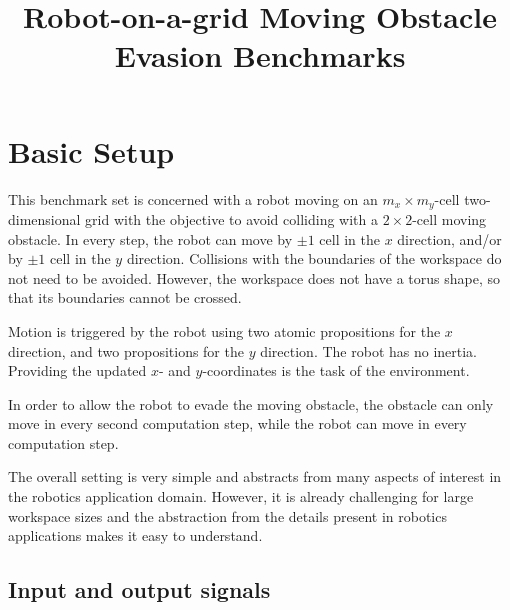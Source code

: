 \documentclass[a4paper,conference,10pt]{IEEEtran}
\author{\IEEEauthorblockN{R\"udiger Ehlers}
\IEEEauthorblockA{University of Bremen \& DFKI GmbH\\
Germany
}}
\begin{document}
\title{Robot-on-a-grid Moving Obstacle Evasion Benchmarks}
\maketitle

\section{Basic Setup}

\noindent This benchmark set is concerned with a robot moving on an $m_x \times m_y$-cell two-dimensional grid with the objective to avoid colliding with a $2 \times 2$-cell moving obstacle. In every step, the robot can move by $\pm 1$ cell in the $x$ direction, and/or by $\pm 1$ cell in the $y$ direction. Collisions with the boundaries of the workspace do not need to be avoided. However, the workspace does not have a torus shape, so that its boundaries cannot be crossed.

Motion is triggered by the robot using two atomic propositions for the $x$ direction, and two propositions for the $y$ direction. The robot has no inertia. Providing the updated $x$- and $y$-coordinates is the task of the environment.

In order to allow the robot to evade the moving obstacle, the obstacle can only move in every second computation step, while the robot can move in every computation step.

The overall setting is very simple and abstracts from many aspects of interest in the robotics application domain. However, it is already challenging for large workspace sizes and the abstraction from the details present in robotics applications makes it easy to understand.

\subsection{Input and output signals}
\end{document}
